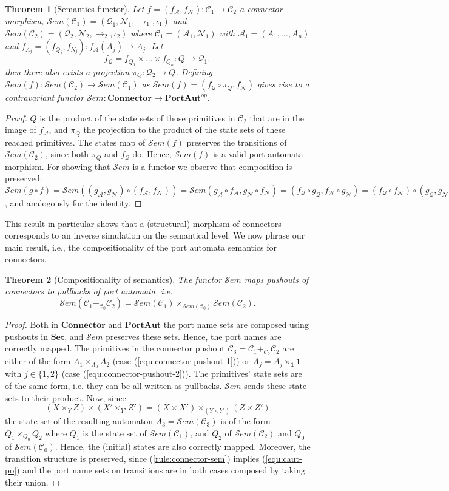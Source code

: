 \documentclass[copyright,creativecommons]{eptcs}
\newtheorem{theorem}{Theorem}
\newcommand{\Set}{\ensuremath{\mathbf{Set}}}
\newcommand{\PA}{\ensuremath{\mathbf{PortAut}}}
\newcommand{\Connector}{\ensuremath{\mathbf{Connector}}}
\newcommand{\one}{\ensuremath{\mathbf{1}}}
\newcommand{\Sem}{\ensuremath{\mathcal{S}em}}
\newcommand{\N}{\ensuremath{\mathcal{N}}}
\newcommand{\A}{\ensuremath{\mathcal{A}}}
\newcommand{\C}{\ensuremath{\mathcal{C}}}
\newcommand{\Q}{\ensuremath{\mathcal{Q}}}
\begin{document}
\begin{theorem}[Semantics functor]
\label{def:functor}
Let $f=(f_\A, f_\N): \C_1 \to \C_2$ 
a connector morphism, 
$\Sem(\C_1) = (\Q_1,\N_1,\to_1,\iota_1)$ and 
$\Sem(\C_2) = (\Q_2,\N_2,\to_2,\iota_2)$ 
where $\C_1 = (\A_1,\N_1)$
with $\A_1 = (A_1,\ldots,A_n)$
and $f_{A_j} = (f_{Q_j},f_{N_j}) : f_\A(A_j) \to A_j$.
Let
\[
f_\Q = f_{Q_1} \times \ldots \times f_{Q_n} : Q \to \Q_1,
\]
then there also exists a projection $\pi_Q: \Q_2 \to Q$.
Defining $\Sem(f) : \Sem(\C_2) \to \Sem(\C_1)$
as $\Sem(f) = (f_\Q \circ \pi_Q,f_\N)$
gives rise to a contravariant functor 
$\Sem: \Connector \to \PA^{op}$.
\end{theorem}
\begin{proof}
$Q$ is the product of the state sets of those primitives
in $\C_2$ that are in the image of $f_\A$, and
$\pi_Q$ the projection to the product of the state sets 
of these reached primitives.
The states map of $\Sem(f)$ preserves the transitions
of $\Sem(\C_2)$, since both $\pi_Q$ and $f_\Q$ do.
Hence, $\Sem(f)$ is a valid port automata morphism.
For showing that $\Sem$ is a functor we
observe that composition is preserved: $\Sem(g \circ
f) = \Sem((g_\A,g_\N) \circ (f_\A,f_\N)) =
\Sem(g_\A \circ f_\A, g_\N \circ f_\N) = 
(f_\Q \circ g_\Q, f_\N \circ g_\N) =
(f_\Q \circ f_\N) \circ (g_\Q,g_\N) = 
\Sem(f) \circ \Sem(g)$, and analogously for the identity.
\end{proof}
This result in particular shows that a (structural) morphism
of connectors corresponds to an inverse simulation on the
semantical level. 
We now phrase our main result, i.e., the compositionality
of the port automata semantics for connectors.
\begin{theorem}[Compositionality of semantics]
\label{thm:compositionality}
The functor $\Sem$ maps pushouts of connectors to pullbacks of port automata,
i.e.
\[
\Sem(\C_1 +_{\C_0} \C_2) = \Sem(\C_1) \times_{\Sem(\C_0)} \Sem(\C_2).
\]
\end{theorem}
\begin{proof}
Both in {\Connector} and {\PA} the port name sets
are composed using pushouts in \Set, and $\Sem$ 
preserves these sets.  Hence, the port names are 
correctly mapped.
The primitives in the connector pushout
$\C_3 = \C_1 +_{\C_0} \C_2$ are either of the form
$A_1 \times_{A_0} A_2$ (case (\ref{equ:connector-pushout-1}))
or $A_j = A_j \times_\one \one$ with $j\in \{1,2\}$
(case (\ref{equ:connector-pushout-2})). The primitives' state
sets are of the same form, i.e. they can be all 
written as pullbacks. {\Sem} sends these 
state sets to their product. Now, since 
\[(X \times_Y Z) \times (X' \times_{Y'} Z') =
(X\times X') \times_{(Y\times Y')} (Z \times Z')\]
the state set of the resulting automaton $A_3 = \Sem(\C_3)$
is of the form $Q_1\times_{Q_0}Q_2$ where $Q_1$ is the state
set of $\Sem(\C_1)$, and $Q_2$ of $\Sem(\C_2)$ and
$Q_0$ of $\Sem(\C_0)$.  Hence, the (initial) states 
are also correctly mapped.
Moreover, the transition structure is preserved, 
since (\ref{rule:connector-sem}) implies (\ref{equ:caut-po})
and the port name sets on transitions are in both cases
composed by taking their union.
\end{proof}
\end{document}
